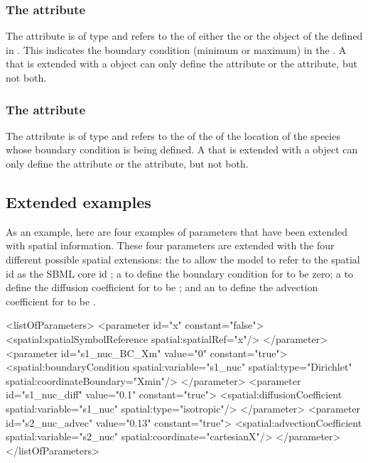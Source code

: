 \subsubsection{The \fixttspace{} attribute}
The  attribute is of type  and refers to the  of either the  or the  object of the \CoordinateComponent defined in \Geometry. This  indicates the boundary condition (minimum or maximum) in the \CoordinateComponent. A \Parameter that is extended with a \BoundaryCondition object can only define the  attribute or the  attribute, but not both.

\subsubsection{The \fixttspace{} attribute}
The  attribute is of type  and refers to the  of the \DomainType of the location of the species whose boundary condition is being defined. A \Parameter that is extended with a \BoundaryCondition object can only define the  attribute or the  attribute, but not both. 


\subsection{Extended \Parameter examples}

As an example, here are four examples of parameters that have been extended with spatial information.  These four parameters are extended with the four different possible spatial extensions: the \SpatialSymbolReference to allow the model to refer to the spatial id  as the SBML core id ; a \BoundaryCondition to define the boundary condition for  to be zero; a \DiffusionCoefficient to define the diffusion coefficient for  to be ; and an \AdvectionCoefficient to define the advection coefficient for  to be .

\begin{example}
  <listOfParameters>
    <parameter id="x" constant="false">
      <spatial:spatialSymbolReference spatial:spatialRef="x"/>
    </parameter>
    <parameter id="s1_nuc_BC_Xm" value="0" constant="true">
      <spatial:boundaryCondition spatial:variable="s1_nuc" spatial:type="Dirichlet"
                                 spatial:coordinateBoundary="Xmin"/>
    </parameter>
    <parameter id="s1_nuc_diff" value="0.1" constant="true">
      <spatial:diffusionCoefficient spatial:variable="s1_nuc" spatial:type="isotropic"/>
    </parameter>
    <parameter id="s2_nuc_advec" value="0.13" constant="true">
      <spatial:advectionCoefficient spatial:variable="s2_nuc" spatial:coordinate="cartesianX"/>
    </parameter>
  </listOfParameters>
\end{example}

